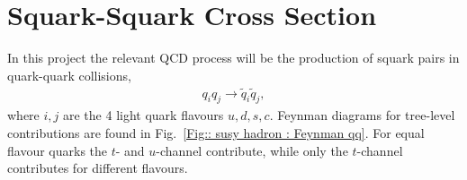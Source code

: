 \documentclass[twoside,english]{uiofysmaster}
\begin{document}
%
%


\section{Squark-Squark Cross Section}
In this project the relevant QCD process will be the production of squark pairs in quark-quark collisions,
\begin{align}
q_i q_j \rightarrow \tilde{q}_i \tilde{q}_j,
\end{align}
where $i,j$ are the 4 light quark flavours $u, d, s, c$. Feynman diagrams for tree-level contributions are found in Fig.\ \ref{Fig:: susy hadron : Feynman qq}. For equal flavour quarks the $t$- and $u$-channel contribute, while only the $t$-channel contributes for different flavours. 
\end{document}
